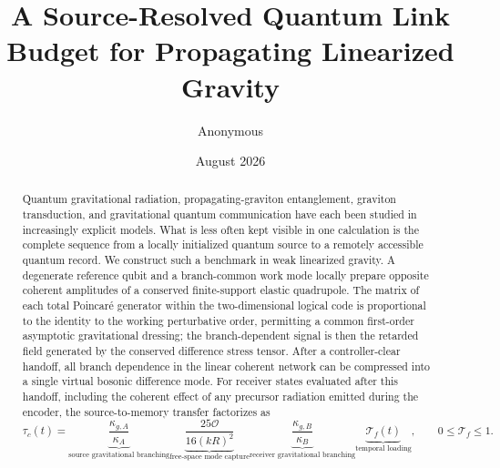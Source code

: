 \documentclass[11pt]{article}
\title{A Source-Resolved Quantum Link Budget for Propagating Linearized Gravity}
\author{Anonymous}
\date{August 2026}
\newcommand{\Tcal}{\mathcal T}
\newcommand{\Ocal}{\mathcal O}
\begin{document}
\maketitle

\begin{abstract}
Quantum gravitational radiation, propagating-graviton entanglement, graviton transduction, and gravitational quantum communication have each been studied in increasingly explicit models. What is less often kept visible in one calculation is the complete sequence from a locally initialized quantum source to a remotely accessible quantum record. We construct such a benchmark in weak linearized gravity. A degenerate reference qubit and a branch-common work mode locally prepare opposite coherent amplitudes of a conserved finite-support elastic quadrupole. The matrix of each total Poincar\'e generator within the two-dimensional logical code is proportional to the identity to the working perturbative order, permitting a common first-order asymptotic gravitational dressing; the branch-dependent signal is then the retarded field generated by the conserved difference stress tensor. After a controller-clear handoff, all branch dependence in the linear coherent network can be compressed into a single virtual bosonic difference mode. For receiver states evaluated after this handoff, including the coherent effect of any precursor radiation emitted during the encoder, the source-to-memory transfer factorizes as
\begin{equation}
\tau_c(t)=
\underbrace{\frac{\kappa_{g,A}}{\kappa_A}}_{\text{source gravitational branching}}
\underbrace{\frac{25\Ocal}{16(kR)^2}}_{\text{free-space mode capture}}
\underbrace{\frac{\kappa_{g,B}}{\kappa_B}}_{\text{receiver gravitational branching}}
\underbrace{\Tcal_f(t)}_{\text{temporal loading}},
\qquad 0\le \Tcal_f\le1.
\label{eq:abstract-link}
\end{equation}

\end{abstract}
\end{document}
